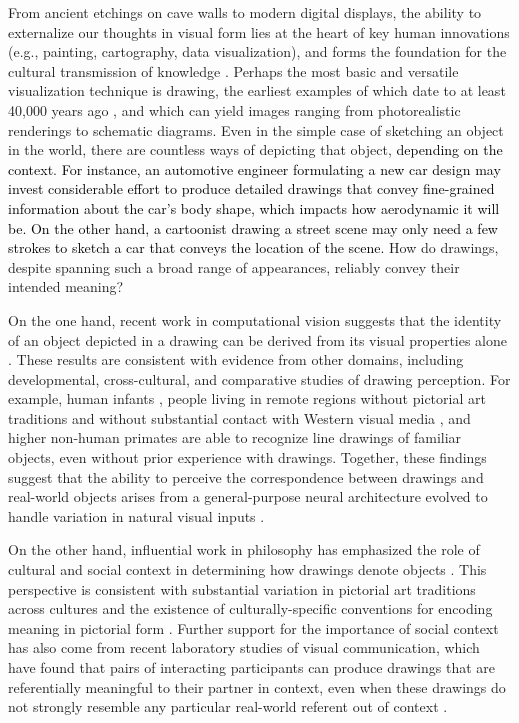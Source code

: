 \documentclass{svjour3}
\newcommand{\revised}[1]{\textcolor{Black}{#1}}
\begin{document}
From ancient etchings on cave walls to modern digital displays, the ability to externalize our thoughts in visual form lies at the heart of key human innovations (e.g., painting, cartography, data visualization), and forms the foundation for the cultural transmission of knowledge \citep*{tomasello2009cultural,donald1991origins}. 
Perhaps the most basic and versatile visualization technique is drawing, the earliest examples of which date to at least 40,000 years ago \citep*{hoffmann2018u,Aubert:2014jy}, and which can yield images ranging from photorealistic renderings to schematic diagrams. 
Even in the simple case of sketching an object in the world, there are countless ways of depicting that object, \revised{depending on the context}.
\revised{For instance, an automotive engineer formulating a new car design may invest considerable effort to produce detailed drawings that convey fine-grained information about the car's body shape, which impacts how aerodynamic it will be. On the other hand, a cartoonist drawing a street scene may only need a few strokes to sketch a car that conveys the location of the scene.}
How do drawings, despite spanning such a broad range of appearances, reliably convey their intended meaning? 

On the one hand, recent work in computational vision suggests that the identity of an object depicted in a drawing can be derived from its visual properties alone \citep*{FanCommon2018}.
These results are consistent with evidence from other domains, including developmental, cross-cultural, and comparative studies of drawing perception. 
For example, human infants \citep*{hochberg1962pictorial}, people living in remote regions without pictorial art traditions and without substantial contact with Western visual media \citep*{kennedy1975outline}, and higher non-human primates \citep*{tanaka2007recognition} are able to recognize line drawings of familiar objects, even without prior experience with drawings.
Together, these findings suggest that the ability to perceive the correspondence between drawings and real-world objects arises from a general-purpose neural architecture evolved to handle variation in natural visual inputs \citep*{Sayim:2011bz,gibson1979ecological}. 

On the other hand, influential work in philosophy has emphasized the role of cultural and social context in determining how drawings denote objects \citep*{goodman1976languages}.
This perspective is consistent with substantial variation in pictorial art traditions across cultures \citep*{gombrich1989story,gombrich1969art} and the existence of culturally-specific conventions for encoding meaning in pictorial form \citep*{boltz1994origin,allen2000middle}. 
Further support for the importance of social context has also come from recent laboratory studies of visual communication, which have found that pairs of interacting participants can produce drawings that are referentially meaningful to their partner in context, even when these drawings do not strongly resemble any particular real-world referent out of context \citep*{Garrod:2007wk,fay2010interactive,Galantucci:2005uh}. 
\end{document}
